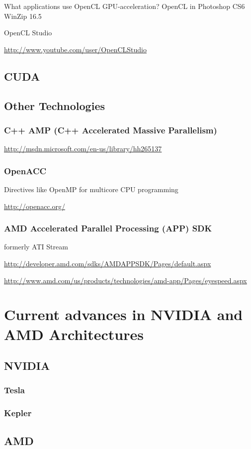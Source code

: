 What applications use OpenCL GPU-acceleration?
OpenCL in Photoshop CS6
WinZip 16.5

OpenCL Studio

\hyperref[OpenCLStudio]{http://www.youtube.com/user/OpenCLStudio}

\subsection{CUDA}

\subsection{Other Technologies}
\subsubsection{C++ AMP (C++ Accelerated Massive Parallelism)}

\hyperref[C++ AMP MSDN]{http://msdn.microsoft.com/en-us/library/hh265137}

\subsubsection{OpenACC}
Directives like OpenMP for multicore CPU programming

\hyperref[OpenACC]{http://openacc.org/}

\subsubsection{AMD Accelerated Parallel Processing (APP) SDK}
formerly ATI Stream

\hyperref[AMD 1]{http://developer.amd.com/sdks/AMDAPPSDK/Pages/default.aspx}

\hyperref[AMD 2]{http://www.amd.com/us/products/technologies/amd-app/Pages/eyespeed.aspx}

\section{Current advances in NVIDIA and AMD Architectures}
\subsection{NVIDIA}
\subsubsection{Tesla}
\subsubsection{Kepler}

\subsection{AMD}
